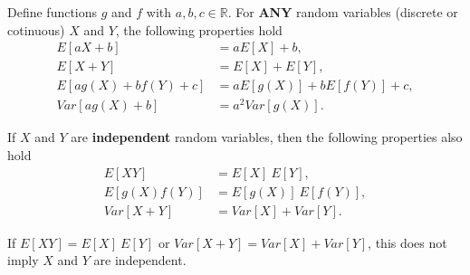 \begin{prop}

Define  functions $g$ and $f$ with $a, b, c \in \mathbb{R}$. For \textbf{ANY} random variables (discrete or cotinuous) $X$ and $Y$, the following properties hold
\begin{align}
E[aX + b] &= aE[X] + b, \\
E[X + Y] &= E[X] + E[Y], \\
E[ag(X) + bf(Y)  + c] &= aE[g(X) ]+ bE[f(Y)] + c, \\
Var[ag(X) + b] &= a^2Var[g(X)].
\end{align}

If $X$ and $Y$ are \textbf{independent} random variables, then the following properties also hold
\begin{align}
E[XY] &= E[X] \ E[Y], \\
E[g(X)f(Y)] &= E[g(X)] \ E[f(Y)], \\
Var[X + Y] &= Var[X]+ Var[Y].
\end{align}

\end{prop}

\begin{note} \label{mod2:note:Independence:Non-implication}
	
	If $E[XY] = E[X] \ E[Y]$ or $Var[X + Y] = Var[X]+ Var[Y]$, this does not imply $X$ and $Y$ are independent.
	
\end{note}










